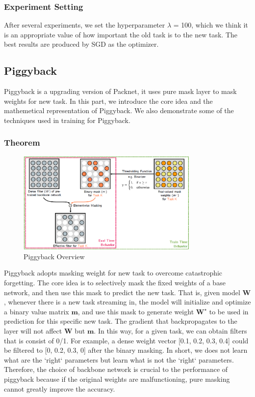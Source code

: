 \subsubsection{Experiment Setting}
After several experiments, we set the hyperparameter $\lambda$ = 100, which we think it is an appropriate value of how important the old task is to the new task. The best results are produced by SGD as the optimizer.




\subsection{Piggyback}
Piggyback is a upgrading version of Packnet, it uses pure mask layer to mask weights for new task. In this part, we introduce the core idea and the mathemetical representation of Piggyback. We also demonstrate some of the techniques used in training for Piggyback.

\subsubsection{Theorem}
\begin{figure}[h]
  \centering
  \includegraphics[width=0.8\textwidth]{figure/piggyback.png}
  \caption{Piggyback Overview}
  \label{piggy}
\end{figure}

Piggyback adopts masking weight for new task to overcome catastrophic forgetting. The core idea is to selectively mask the fixed weights of a base network, and then use this mask to predict the new task. That is, given model $\mathbf{W}$, whenever there is a new task streaming in, the model will initialize and optimize a binary value matrix $\mathbf{m}$, and use this mask to generate weight $\mathbf{W^\star}$ to be used in prediction for this specific new task. The gradient that backpropagates to the layer will not affect $\mathbf{W}$ but $\mathbf{m}$. In this way, for a given task, we can obtain filters that is consist of 0/1. For example, a dense weight vector [0.1, 0.2, 0.3, 0.4] could be filtered to [0, 0.2, 0.3, 0] after the binary masking. In short, we does not learn what are the `right` parameters but learn what is not the `right` parameters. Therefore, the choice of backbone network is crucial to the performance of piggyback because if the original weights are malfunctioning, pure masking cannot greatly improve the accuracy.

